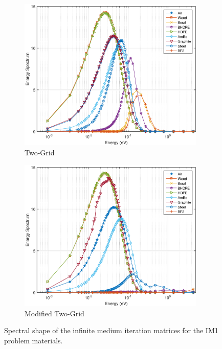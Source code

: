\begin{figure}
\centering
	\begin{subfigure}[b]{0.775\textwidth}
		\centering
		\includegraphics[width=0.975\textwidth]{figures/sec_DSA/IM1_EC_TG.eps}
		\caption{Two-Grid}
	\end{subfigure}
	
	\begin{subfigure}[b]{0.775\textwidth}
		\centering
		\includegraphics[width=0.975\textwidth]{figures/sec_DSA/IM1_EC_MTG.eps}
		\caption{Modified Two-Grid}
	\end{subfigure}
\caption{Spectral shape of the infinite medium iteration matrices for the IM1 problem materials.}
\label{fig::IM1_mats_EC_TGandMTG}
\end{figure}

